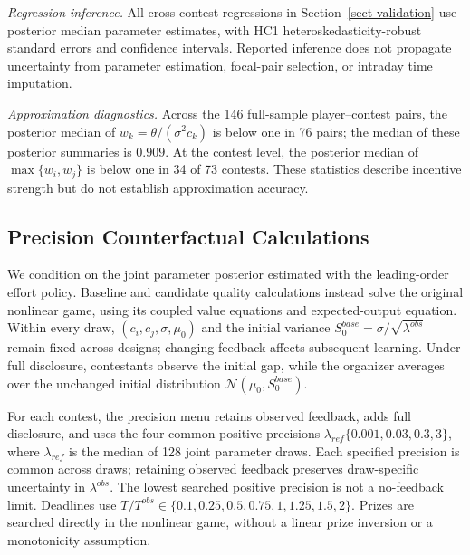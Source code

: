 \documentclass[mnsc]{informs3}
\begin{document}
\begin{APPENDICES}
{\textit{Regression inference.}} All cross-contest regressions in Section~\ref{sect-validation} use posterior median parameter estimates, {with HC1 heteroskedasticity-robust standard errors and confidence intervals. Reported inference does not propagate uncertainty from parameter estimation, focal-pair selection, or intraday time imputation.}

{\textit{Approximation diagnostics.}} Across the 146 full-sample player--contest pairs, the posterior median of $w_k=\theta/(\sigma^2c_k)$ is below one in 76 pairs; the median of these posterior summaries is $0.909$. At the contest level, the posterior median of $\max\{w_i,w_j\}$ is below one in 34 of 73 contests. These statistics describe incentive strength but do not establish approximation accuracy.

\subsection{Precision Counterfactual Calculations}\label{app-precision-counterfactual}

We condition on the joint parameter posterior estimated with the leading-order effort policy. Baseline and candidate quality calculations instead solve the original nonlinear game, using its coupled value equations and expected-output equation. Within every draw, $(c_i,c_j,\sigma,\mu_0)$ and the initial variance $S_0^{base}=\sigma/\sqrt{\lambda^{obs}}$ remain fixed across designs; changing feedback affects subsequent learning. Under full disclosure, contestants observe the initial gap, while the organizer averages over the unchanged initial distribution $\mathcal N(\mu_0,S_0^{base})$.

For each contest, the precision menu retains observed feedback, adds full disclosure, and uses the four common positive precisions $\lambda_{ref}\{0.001,0.03,0.3,3\}$, where $\lambda_{ref}$ is the median of 128 joint parameter draws. Each specified precision is common across draws; retaining observed feedback preserves draw-specific uncertainty in $\lambda^{obs}$. The lowest searched positive precision is not a no-feedback limit. Deadlines use $T/T^{obs}\in\{0.1,0.25,0.5,0.75,1,1.25,1.5,2\}$. Prizes are searched directly in the nonlinear game, without a linear prize inversion or a monotonicity assumption.


\end{APPENDICES}
\end{document}
